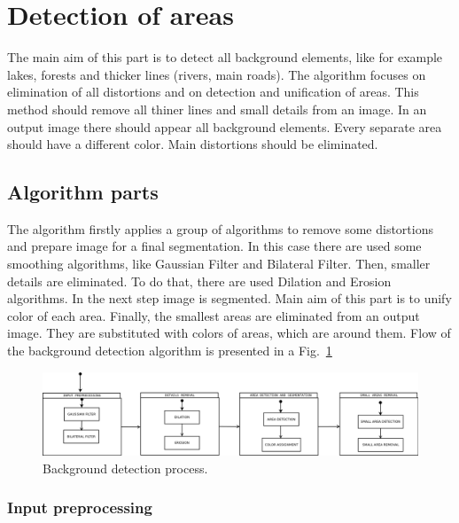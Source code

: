 \documentclass[a4paper,onecolumn,oneside,12pt]{memoir}
\begin{document}
\section{Detection of areas}

The main aim of this part is to detect all background elements, like for example lakes, forests and
thicker lines (rivers, main roads). The algorithm focuses on elimination of all distortions and on
detection and unification of areas. This method should remove all thiner lines and small details
from an image. In an output image there should appear all background elements. Every separate
area should have a different color. Main distortions should be eliminated.

\subsection{Algorithm parts}

The algorithm firstly applies a group of algorithms to remove some distortions and prepare image for
a final segmentation. In this case there are used some smoothing algorithms, like Gaussian Filter
and Bilateral Filter. Then, smaller details are eliminated. To do that, there are used Dilation and
Erosion algorithms. In the next step image is segmented. Main aim of this part is to unify color of
each area. Finally, the smallest areas are eliminated from an output image. They are substituted
with colors of areas, which are around them. Flow of the background detection algorithm is presented
in a Fig.~\ref{backgroundDetectionImage}

\begin{figure}[!ht]
\begin{center}
\includegraphics[scale=0.3]{images/backgroundDetection.png}
\caption{Background detection process.}
\label{backgroundDetectionImage}
\end{center}
\end{figure}

\subsubsection{Input preprocessing}
\end{document}
